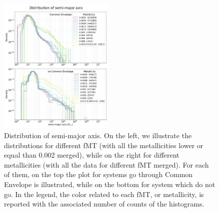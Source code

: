 \documentclass[prb,twocolumn,9pt]{revtex4-1}
\begin{document}
\begin{figure}[h!]
\begin{minipage}[c]{2.0\columnwidth}
    \hskip 1mm
   \includegraphics[width=0.49\textwidth]{images/assignment2_1/hist_sep_metal.pdf}
    \caption{ Distribution of semi-major axis. On the left, we illustrate the distributions for different fMT (with all the metallicities lower or equal than 0.002 merged), while on the right for different metallicities (with all the data for different fMT merged). For each of them, on the top the plot for systems go through Common Envelope is illustrated, while on the bottom for system which do not go. In the legend, the color related to each  fMT, or metallicity, is reported  with the associated number of counts of the histograms. }
    \label{fig:ass2_1_sep}
    \end{minipage}
\end{figure}

\clearpage


\nocite{mapelli2018astrophysics}
\nocite{dina}
\nocite{2018MNRAS.480.2011G}
\nocite{2020ApJ...891..141G}
\nocite{2018MNRAS.474.2959G}
\nocite{2012ApJ...759...52D}
\nocite{2019MNRAS.490.3740N}

\printbibliography
\vspace{0.65cm}
\end{document}
